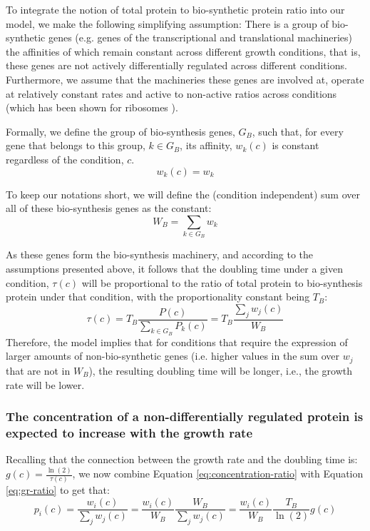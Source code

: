 \documentclass[a4paper]{article}
\begin{document}
To integrate the notion of total protein to bio-synthetic protein ratio into our model, we make the following simplifying assumption:
There is a group of bio-synthetic genes (e.g. genes of the transcriptional and translational machineries) the affinities of which remain constant across different growth conditions, that is, these genes are not actively differentially regulated across different conditions.
Furthermore, we assume that the machineries these genes are involved at, operate at relatively constant rates and active to non-active ratios across conditions (which has been shown for ribosomes \cite{Bremer1987}).

Formally, we define the group of bio-synthesis genes, $G_B$, such that, for every gene that belongs to this group, $k \in G_B$, its affinity, $w_k(c)$ is constant regardless of the condition, $c$.
\begin{equation}
  \label{eq:biosynth-def}
  w_k(c)=w_k
\end{equation}

To keep our notations short, we will define the (condition independent) sum over all of these bio-synthesis genes as the constant:
\[
W_B = \sum_{k\in G_B}w_k
\]

As these genes form the bio-synthesis machinery, and according to the assumptions presented above, it follows that the doubling time under a given condition, $\tau(c)$ will be proportional to the ratio of total protein to bio-synthesis protein under that condition, with the proportionality constant being $T_B$:
\begin{equation}
  \label{eq:gr-ratio}
  \tau(c) = T_B\frac{P(c)}{\sum_{k\in G_B}P_k(c)}=T_B\frac{\sum_jw_j(c)}{W_B}
\end{equation}
Therefore, the model implies that for conditions that require the expression of larger amounts of non-bio-synthetic genes (i.e. higher values in the sum over $w_j$ that are not in $W_B$), the resulting doubling time will be longer, i.e., the growth rate will be lower.

\subsubsection{The concentration of a non-differentially regulated protein is expected to increase with the growth rate} 
Recalling that the connection between the growth rate and the doubling time is: $g(c)=\frac{\ln(2)}{\tau(c)}$, we now combine Equation \ref{eq:concentration-ratio} with Equation \ref{eq:gr-ratio} to get that:
\begin{equation}
  \label{eq:default-response}
  p_i(c)=\frac{w_i(c)}{\sum_jw_j(c)}=\frac{w_i(c)}{W_B}\frac{W_B}{\sum_jw_j(c)}=\frac{w_i(c)}{W_B}\frac{T_B}{\ln(2)}g(c)
\end{equation}
\end{document}
